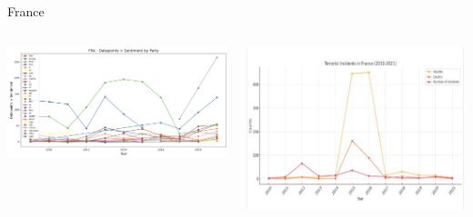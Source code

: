 \documentclass[8pt]{beamer}
\begin{document}
\begin{frame}{France}
    \begin{columns}
        
    
    \begin{column}{0.5\textwidth} %
        \centering
        \includegraphics[width=\textwidth]{img/FRA.png}
        
    \end{column}

    \begin{column}{0.5\textwidth} %
        \centering
        \includegraphics[width=\textwidth]{img/terrorism.png}
        
    \end{column}
    \end{columns}
\end{frame}
\end{document}
